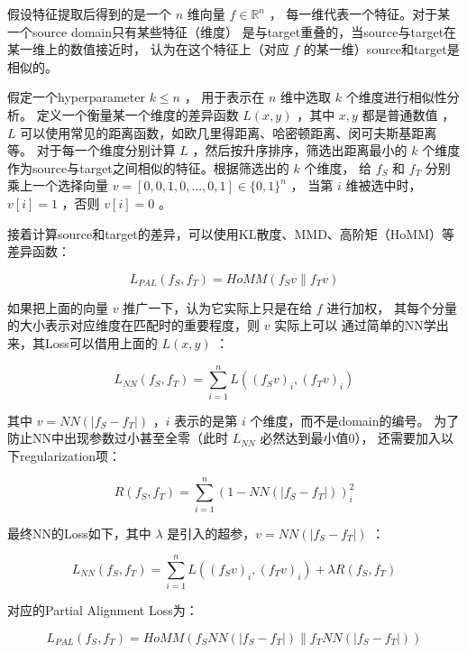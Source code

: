 \documentclass[UTF8]{ctexart}
\begin{document}
                假设特征提取后得到的是一个 $n$ 维向量 $f \in \mathbb{R}^n$ ，
                每一维代表一个特征。对于某一个source domain只有某些特征（维度）
                是与target重叠的，当source与target在某一维上的数值接近时，
                认为在这个特征上（对应 $f$ 的某一维）source和target是相似的。

                假定一个hyperparameter $k \leq n$ ，
                用于表示在 $n$ 维中选取 $k$ 个维度进行相似性分析。
                定义一个衡量某一个维度的差异函数 $L(x, y)$ ，其中 $x, y$ 都是普通数值
                ，$L$ 可以使用常见的距离函数，如欧几里得距离、哈密顿距离、闵可夫斯基距离等。
                对于每一个维度分别计算 $L$ ，然后按升序排序，筛选出距离最小的 $k$ 个维度
                作为source与target之间相似的特征。根据筛选出的 $k$ 个维度，
                给 $f_S$ 和 $f_T$ 分别乘上一个选择向量 $v=[0, 0, 1, 0, \dots, 0, 1]\in \{0, 1\}^n$ ，
                当第 $i$ 维被选中时，$v[i]=1$ ，否则 $v[i]=0$ 。

                接着计算source和target的差异，可以使用KL散度、MMD、高阶矩（HoMM）等差异函数：

                $$
                    L_{PAL}(f_S, f_T) = HoMM(f_Sv\|f_Tv)
                $$

                如果把上面的向量 $v$ 推广一下，认为它实际上只是在给 $f$ 进行加权，
                其每个分量的大小表示对应维度在匹配时的重要程度，则 $v$ 实际上可以
                通过简单的NN学出来，其Loss可以借用上面的 $L(x, y)$ ：

                $$
                    L_{NN}(f_S, f_T) = \sum_{i=1}^n L((f_Sv)_i, (f_Tv)_i)
                $$

                其中 $v = NN(|f_S - f_T|)$ ，$i$ 表示的是第 $i$ 个维度，而不是domain的编号。
                为了防止NN中出现参数过小甚至全零（此时 $L_{NN}$ 必然达到最小值0），
                还需要加入以下regularization项：

                $$
                    R(f_S, f_T) = \sum_{i=1}^n (1 - NN(|f_S - f_T|))^2_i
                $$

                最终NN的Loss如下，其中 $\lambda$ 是引入的超参，$v = NN(|f_S - f_T|)$ ：

                $$
                    L_{NN}(f_S, f_T) = \sum_{i=1}^n L((f_Sv)_i, (f_Tv)_i) +
                    \lambda R(f_S, f_T)
                $$

                对应的Partial Alignment Loss为：

                $$
                    L_{PAL}(f_S, f_T) = HoMM(f_S NN(|f_S - f_T|)\|f_T NN(|f_S - f_T|))
                $$
\end{document}
